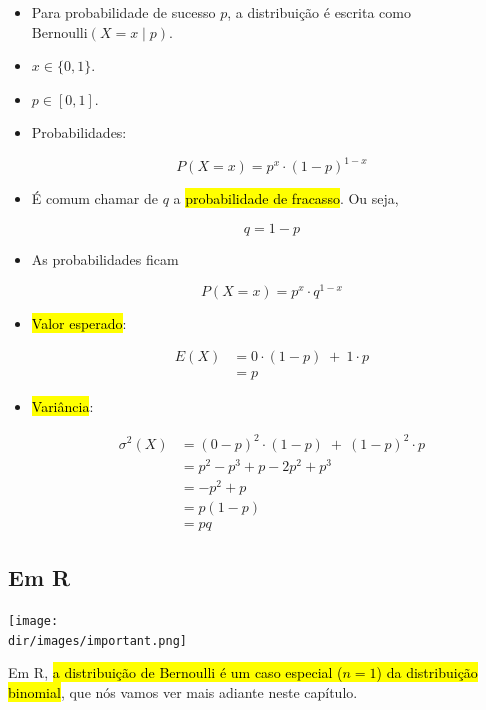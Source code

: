 \documentclass[
  11pt]{report}
\newcommand{\dir}{/ssd/R/x86_64-pc-linux-gnu-library/4.3/fnaufelRmd/rmarkdown/resources}
\newenvironment{rmdimportant}
{
  \begin{myimportant}
    \texttt{[image: \\dir/images/important.png]}
    \tcblower
  }
  {
  \end{myimportant}
}
\begin{document}
\begin{itemize}
\item
  Para probabilidade de sucesso $p$, a distribuição é escrita como $\text{Bernoulli}(X = x \mid p)$.
\item
  $x \in \{0, 1\}$.
\item
  $p \in [0, 1]$.
\item
  Probabilidades:

  \[
  P(X = x) = p^x \cdot (1 - p)^{1 - x}
  \]
\item
  É comum chamar de $q$ a {\hl{probabilidade de fracasso}}. Ou seja,

  \[
  q = 1 - p
  \]
\item
  As probabilidades ficam

  \[
  P(X = x) = p^x \cdot q^{1 - x}
  \]
\item
  {\hl{Valor esperado}}:

  \[
  \begin{aligned}
  E(X) &= 0 \cdot (1 - p) \;+\: 1 \cdot p \\
       &= p
  \end{aligned}
  \]
\item
  {\hl{Variância}}:

  \[
  \begin{aligned}
  \sigma^2(X) &= (0 - p)^2 \cdot (1 - p) \;+\: (1 - p)^2 \cdot p \\
       &= p^2 - p^3 + p - 2p^2 + p^3 \\
       &= -p^2 + p \\
       &= p(1 - p) \\
       &= pq
  \end{aligned}
  \]
\end{itemize}

\hypertarget{em-r-1}{%
\subsection{Em R}\label{em-r-1}}

\begin{rmdimportant}
Em R, {\hl{a distribuição de Bernoulli é um caso especial ($n = 1$) da distribuição binomial}}, que nós vamos ver mais adiante neste capítulo.

\end{rmdimportant}
\end{document}
